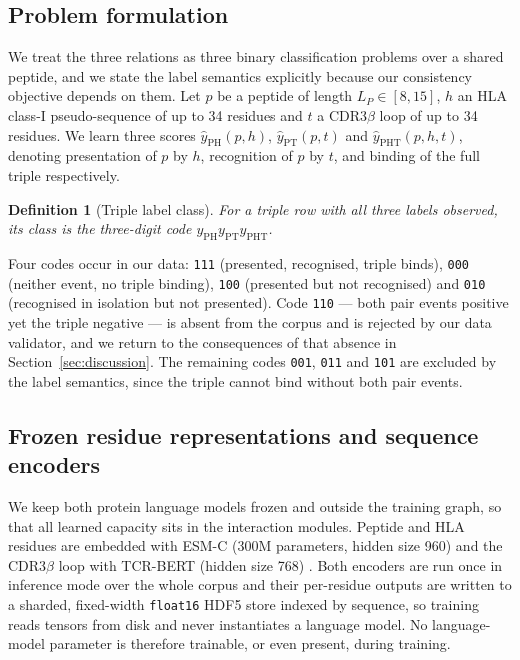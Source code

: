 \documentclass[webpdf,modern,large,namedate]{oup-authoring-template}
\theoremstyle{thmstyleone}
\theoremstyle{thmstyletwo}
\theoremstyle{thmstylethree}
\newtheorem{definition}{Definition}
\newcommand{\PHm}{\mathrm{PH}}
\newcommand{\PTm}{\mathrm{PT}}
\newcommand{\PHTm}{\mathrm{PHT}}
\begin{document}
\subsection{Problem formulation}\label{sec:method:problem}

We treat the three relations as three binary classification problems over a
shared peptide, and we state the label semantics explicitly because our
consistency objective depends on them. Let $p$ be a peptide of length
$L_P\in[8,15]$, $h$ an HLA class-I pseudo-sequence of up to 34 residues and $t$
a CDR3$\beta$ loop of up to 34 residues. We learn three scores
$\hat y_{\PHm}(p,h)$, $\hat y_{\PTm}(p,t)$ and $\hat y_{\PHTm}(p,h,t)$,
denoting presentation of $p$ by $h$, recognition of $p$ by $t$, and binding of
the full triple respectively.

\begin{definition}[Triple label class]\label{def:class}
For a triple row with all three labels observed, its class is the three-digit
code $y_{\PHm}y_{\PTm}y_{\PHTm}$.
\end{definition}

Four codes occur in our data: \texttt{111} (presented, recognised, triple
binds), \texttt{000} (neither event, no triple binding), \texttt{100}
(presented but not recognised) and \texttt{010} (recognised in isolation but
not presented). Code \texttt{110} --- both pair events positive yet the triple
negative --- is absent from the corpus and is rejected by our data validator,
and we return to the consequences of that absence in
Section~\ref{sec:discussion}. The remaining codes \texttt{001}, \texttt{011}
and \texttt{101} are excluded by the label semantics, since the triple cannot
bind without both pair events.

\subsection{Frozen residue representations and sequence
encoders}\label{sec:method:plm}

We keep both protein language models frozen and outside the training graph, so
that all learned capacity sits in the interaction modules. Peptide and HLA
residues are embedded with ESM-C (300M parameters, hidden size 960)
\citep{esmc2024} and the CDR3$\beta$ loop with TCR-BERT (hidden size 768)
\citep{wu2024tcrbert}. Both encoders are run once in inference mode over the
whole corpus and their per-residue outputs are written to a sharded,
fixed-width \texttt{float16} HDF5 store indexed by sequence, so training reads
tensors from disk and never instantiates a language model. No language-model
parameter is therefore trainable, or even present, during training.
\end{document}
